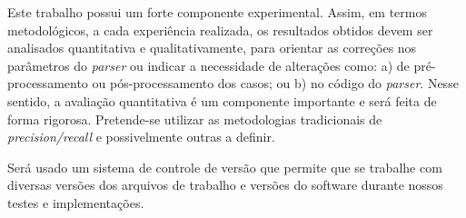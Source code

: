 Este trabalho possui um forte componente experimental. Assim, em termos metodológicos, a cada experiência realizada, os resultados obtidos devem ser analisados quantitativa e qualitativamente, para orientar as correções nos parâmetros do \emph{parser} ou indicar a necessidade de alterações como: a) de pré-processamento ou pós-processamento dos casos; ou b) no código do \emph{parser}. Nesse sentido, a avaliação quantitativa é um componente importante e será feita de forma rigorosa. Pretende-se utilizar as metodologias tradicionais de \emph{precision/recall} \cite{black93} e possivelmente outras a definir.

Será usado um sistema de controle de versão que permite que se trabalhe com diversas versões dos arquivos de trabalho
e  versões do software durante nossos testes e implementações.



